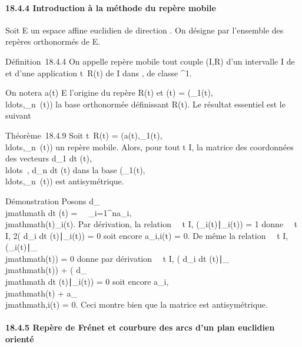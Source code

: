 \documentclass[]{article}
\begin{document}
\paragraph{18.4.4 Introduction à la méthode du repère mobile}

Soit E un espace affine euclidien de direction \vecE.
On désigne par  l'ensemble des repères orthonormés de E.

Définition~18.4.4 On appelle repère mobile tout couple (I,R) d'un
intervalle I de ~ et d'une application t\mapsto~R(t)
de I dans , de classe ^1.

On notera a(t) \in E l'origine du repère R(t) et (t) =
(\overrightarrowe_1(t),\\ldots,\overrightarrowe_n~(t))
la base orthonormée définissant R(t). Le résultat essentiel est le
suivant

Théorème~18.4.9 Soit t\mapsto~R(t) =
(a(t),\overrightarrowe_1(t),\\ldots,\overrightarrowe_n~(t))
un repère mobile. Alors, pour tout t \in I, la matrice des coordonnées des
vecteurs  d\overrightarrowe_1
\over dt
(t),\\ldots~,
d\overrightarrowe_n \over
dt (t) dans la base
(\overrightarrowe_1(t),\\ldots,\overrightarrowe_n~(t))
est antisymétrique.

Démonstration Posons  d\overrightarrowe_\\jmathmath
\over dt (t) =\
\sum ~
_i=1^na_i,\\jmathmath(t)\overrightarrowe_i(t).
Par dérivation, la relation \forall~~t \in I,
(\overrightarrowe_i(t)∣\overrightarrowe_i(t))
= 1 donne \forall~~t \in I, 2(
d\overrightarrowe_i \over
dt
(t)∣\overrightarrowe_i(t))
= 0 soit encore a_i,i(t) = 0. De même la relation
\forall~~t \in I,
(\overrightarrowe_i(t)∣\overrightarrowe_\\jmathmath(t))
= 0 donne par dérivation \forall~~t \in I, (
d\overrightarrowe_i \over
dt
(t)∣\overrightarrowe_\\jmathmath(t))
+ ( d\overrightarrowe_\\jmathmath
\over dt
(t)∣\overrightarrowe_i(t))
= 0 soit encore a_i,\\jmathmath(t) + a_\\jmathmath,i(t) = 0. Ceci montre
bien que la matrice est antisymétrique.

\paragraph{18.4.5 Repère de Frénet et courbure des arcs d'un plan
euclidien orienté}
\end{document}
